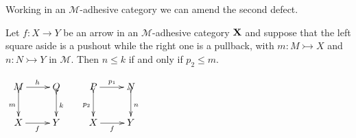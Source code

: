 \documentclass[a4paper,UKenglish,cleveref,pdftex, thm-restate,numberwithinsect,anonymous]{lipics}
\newcommand{\id}[1]{\mathsf{id}_{#1}}
\def\X{\textbf {\textup{X}}}
\def\Set{\textbf {\textup{Set}}}
\begin{document}
\iffalse
	\begin{example}
		In a generic category $\X$, pushout complements may not exist: in $\Set$ the arrows $?_{2}\colon \emptyset \to 2$ and $!_2\colon 2\to 1$ do not have a pushout complement.

		Moreover, composable arrows $f\colon X\to Y$ and $g\colon Y\to Z$ may have  pushout complements which are non-isomorphic: for instance, in $\Set$ the two squares below are both pushouts.

		\[\xymatrix{2 \ar[r]^{!_2} \ar[d]_{\id{2}}& 1 \ar[d]^{\id{1}} & 2 \ar[r]^{!_2} \ar[d]_{!_2}& 1 \ar[d]^{\id{1}}\\ 2 \ar[r]_{!_2}& 1 & 1 \ar[r]_{\id{1}}& 1}\]
	\end{example}
\fi

Working in an $\mathcal{M}$-adhesive category we can amend the second defect.

\noindent
\parbox{8.5cm}{
	\begin{lemma}\label{lem:radj}
		Let $f\colon X \to Y$ be an arrow in an $\mathcal{M}$-adhesive category $\X$ and suppose that the left square aside is a pushout while the  right one is a pullback, with $ m\colon M \rightarrowtail X$ and $n\colon N \rightarrowtail Y$ in $\mathcal{M}$.
		Then $n\leq k$ if and only if $p_2\leq m$.
	\end{lemma}}
\parbox{3cm}{\vspace{-2ex}
	$\xymatrix{M \ar@{>->}[d]_{m}\ar[r]^{h}& Q \ar@{>->}[d]^{k} & P \ar[r]^{p_1} \ar@{>->}[d]_{p_2}& N \ar@{>->}[d]^{n}\\X\ar[r]_{f}&Y &X \ar[r]_f&Y}$}
\end{document}

